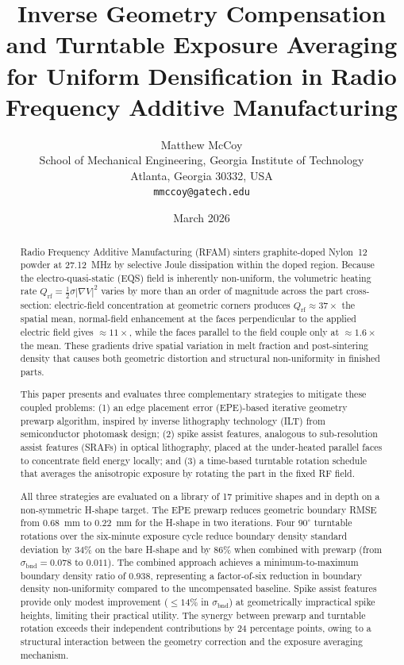 \documentclass[10pt,twocolumn]{article}
\title{\textbf{Inverse Geometry Compensation and Turntable Exposure
Averaging for Uniform Densification in Radio Frequency Additive
Manufacturing}}
\author{Matthew McCoy\\
\small School of Mechanical Engineering, Georgia Institute of Technology\\
\small Atlanta, Georgia 30332, USA\\
\small \texttt{mmccoy@gatech.edu}}
\date{March 2026}
\newcommand{\Qrf}{Q_{\mathrm{rf}}}
\newcommand{\bndstd}{\sigma_{\mathrm{bnd}}}
\newcommand{\half}{\tfrac{1}{2}}
\begin{document}
\maketitle

\begin{abstract}
Radio Frequency Additive Manufacturing (RFAM) sinters graphite-doped
Nylon~12 powder at \SI{27.12}{\mega\hertz} by selective Joule
dissipation within the doped region.  Because the electro-quasi-static
(EQS) field is inherently non-uniform, the volumetric heating rate
$\Qrf = \half\sigma|\nabla V|^{2}$ varies by more than an order of
magnitude across the part cross-section: electric-field concentration
at geometric corners produces $\Qrf \approx 37\times$ the spatial
mean, normal-field enhancement at the faces perpendicular to the applied
electric field gives $\approx 11\times$, while the faces parallel to
the field couple only at $\approx 1.6\times$ the mean.  These gradients
drive spatial variation in melt fraction and post-sintering density that
causes both geometric distortion and structural non-uniformity in
finished parts.

This paper presents and evaluates three complementary strategies to
mitigate these coupled problems: (1) an edge placement error
(EPE)-based iterative geometry prewarp algorithm, inspired by inverse
lithography technology (ILT) from semiconductor photomask design;
(2) spike assist features, analogous to sub-resolution assist features
(SRAFs) in optical lithography, placed at the under-heated parallel
faces to concentrate field energy locally; and (3) a time-based
turntable rotation schedule that averages the anisotropic exposure by
rotating the part in the fixed RF field.

All three strategies are evaluated on a library of 17 primitive shapes
and in depth on a non-symmetric H-shape target.  The EPE prewarp
reduces geometric boundary RMSE from \SI{0.68}{\milli\meter} to
\SI{0.22}{\milli\meter} for the H-shape in two iterations.  Four $90^\circ$
turntable rotations over the six-minute exposure cycle reduce boundary
density standard deviation by 34\% on the bare H-shape and by 86\%
when combined with prewarp (from $\bndstd = 0.078$ to $0.011$).  The
combined approach achieves a minimum-to-maximum boundary density ratio
of 0.938, representing a factor-of-six reduction in boundary density
non-uniformity compared to the uncompensated baseline.  Spike assist
features provide only modest improvement ($\leq 14\%$ in $\bndstd$)
at geometrically impractical spike heights, limiting their practical
utility.  The synergy between prewarp and turntable rotation exceeds
their independent contributions by 24 percentage points, owing to a
structural interaction between the geometry correction and the exposure
averaging mechanism.
\end{abstract}
\end{document}
